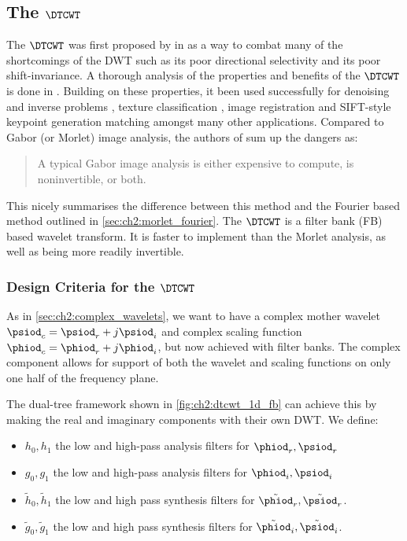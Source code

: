 \subsection{The $\DTCWT$}
  The $\DTCWT$ was first proposed by \citeauthor{kingsbury_dual-tree_1998} in
  \cite{kingsbury_dual-tree_1998, kingsbury_dual-tree_1998-1} as a way to combat
  many of the shortcomings of the DWT such as its poor directional
  selectivity and its poor shift-invariance. A thorough analysis of the
  properties and benefits of the $\DTCWT$ is done in
  \cite{kingsbury_image_1999,selesnick_dual-tree_2005}. Building on these
  properties, it been used
  successfully for denoising and inverse problems \cite{rivaz_bayesian_2001,
  zhang_bayesian_2008, zhang_variational_2015, miller_image_2008}, texture
  classification \cite{hatipoglu_texture_1999, rivaz_complex_1999}, image
  registration \cite{loo_motion-estimation-based_2001, chen_efficient_2012}
  and SIFT-style keypoint generation matching \cite{fauqueur_multiscale_2006,
  anderson_determining_2005, anderson_rotation-invariant_2006,
  bendale_multiscale_2010, ng_robust_2012} amongst many other applications.
  Compared to Gabor (or Morlet) image analysis, the authors of
  \cite{selesnick_dual-tree_2005} sum up the dangers as:
  \begin{quote}
    A typical Gabor image analysis is either expensive to compute, is
    noninvertible, or both.
  \end{quote}
  This nicely summarises the difference between this method and the Fourier
  based method outlined in \autoref{sec:ch2:morlet_fourier}. The $\DTCWT$ is
  a filter bank (FB) based wavelet transform. It is faster
  to implement than the Morlet analysis, as well as being more readily invertible.

\subsubsection{Design Criteria for the $\DTCWT$}
  As in \autoref{sec:ch2:complex_wavelets}, we want to have a complex mother
  wavelet $\psiod_c = \psiod_r + j\psiod_i$ and complex scaling function $\phiod_c =
  \phiod_r + j\phiod_i$, but now achieved with filter banks. The complex component
  allows for support of both the wavelet and scaling functions on only one half of
  the frequency plane.

  The dual-tree framework shown in \autoref{fig:ch2:dtcwt_1d_fb} can achieve this
  by making the real and imaginary components with their own DWT.
  We define:
  \begin{itemize}
    \item $h_0, h_1$ the low and high-pass analysis filters for $\phiod_r, \psiod_r$
    \item $g_0, g_1$ the low and high-pass analysis filters for $\phiod_i, \psiod_i$
    \item $\tilde{h}_0, \tilde{h}_1$ the low and high pass synthesis filters
      for $\tilde{\phiod}_r, \tilde{\psiod}_r$.
    \item $\tilde{g}_0, \tilde{g}_1$ the low and high pass synthesis filters for
      $\tilde{\phiod}_i, \tilde{\psiod}_i$.
  \end{itemize}

